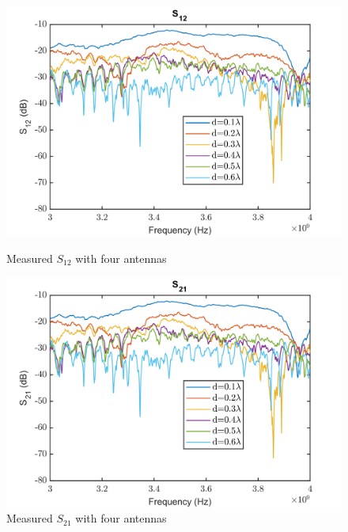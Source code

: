\begin{figure}[H]
  \centering
  \begin{minipage}[b]{0.5\textwidth}
	\includegraphics[scale = 0.5]{figures/measurement/antennas/spar_four_ant_s12.png}
	\caption{Measured $S_{12}$ with four antennas}
    \label{fig:chamber_four_ant_s12}
  \end{minipage}
  \hfill
  \begin{minipage}[b]{0.4\textwidth}
\includegraphics[scale = 0.5]{figures/measurement/antennas/spar_four_ant_s21.png}
\caption{Measured $S_{21}$ with four antennas}
    \label{fig:chamber_four_ant_s21}
  \end{minipage}
\end{figure}

